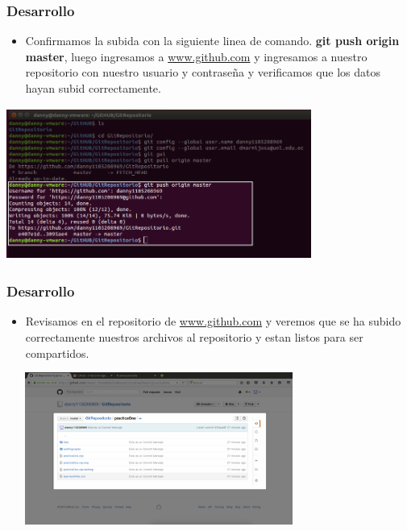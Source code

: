 \documentclass[8pt]{beamer}
\begin{document}
\begin{frame}
\frametitle{Desarrollo}
\setlength{\parskip}{03pt}
\begin{center}
\begin{itemize}
\justifying
\item{Confirmamos la subida con la siguiente linea de comando. \textbf{git push origin master}, luego ingresamos a \url{www.github.com} y ingresamos a nuestro repositorio con nuestro usuario y contraseña y verificamos que los datos hayan subid correctamente.}\end{itemize} 
\setlength{\parskip}{08pt}
\includegraphics[width=10cm, height=5cm]{img/diecinueve}
\end{center}
\end{frame}



\begin{frame}
\frametitle{Desarrollo}
\setlength{\parskip}{03pt}
\begin{center}
\begin{itemize}
\justifying
\item{Revisamos en el repositorio de \url{www.github.com} y veremos que se ha subido correctamente nuestros archivos al repositorio y estan listos para ser compartidos.}
\end{itemize} 
\setlength{\parskip}{08pt}
\includegraphics[width=10cm, height=5cm]{img/veinte}
\end{center}
\end{frame}
\end{document}
